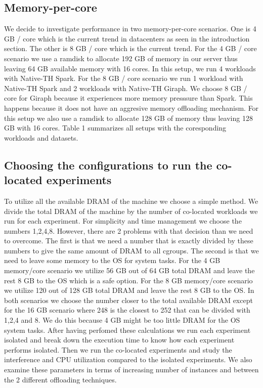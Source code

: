 \subsection{Memory-per-core}
We decide to investigate performance in two memory-per-core scenarios. One is 4 GB / core 
which is the current trend in datacenters as seen in the introduction section. The other
is 8 GB / core which is the current trend. For the 4 GB / core scenario we use a ramdisk to 
allocate 192 GB of memory in our server thus leaving 64 GB available memory with 16 cores. In this setup, we run 4
workloads with Native-TH Spark. For the 8 GB / core scenario we run 1 workload with Native-TH Spark and 2 workloads with Native-TH Giraph. We choose 8 GB / core for Giraph because it experiences more memory presssure than Spark. This happens because it does not have
an aggresive memory offloading mechanism. For this setup we also use a ramdisk to allocate 128 GB of memory thus leaving 
128 GB with 16 cores. 
Table 1 summarizes all setups with the coresponding workloads and datasets.

\subsection{Choosing the configurations to run the co-located experiments}
To utilize all the available DRAM of the machine we choose a simple method. 
We divide the total DRAM of the machine by the number of co-located workloads we run for each experiment.
For simplicity and time management we choose the numbers 1,2,4,8. However, there are 2 problems with that decision
than we need to overcome. The first is that we need a number that is exactly divided by these numbers to give the same amount of DRAM to
all cgroups. The second is that we need to leave some memory to the OS for system tasks. For the 4 GB memory/core scenario we utilize
56 GB out of 64 GB total DRAM and leave the rest 8 GB to the OS which is a safe option. For the 8 GB memory/core scenario we utilize
120 out of 128 GB total DRAM and leave the rest 8 GB to the OS. 
In both scenarios we choose the number closer to
the total available DRAM except for the 16 GB scenario where 248 is the closest to 252 that can be divided with 1,2,4 and 8. We do this because 4 GB might be too little DRAM for the OS system tasks. After having perfomed these calculations we run each experiment isolated and break down the execution time to know how each experiment performs isolated. Then we run the co-located experiments and study the interference and CPU utilization compared to the isolated experiments. We also examine these parameters in terms of increasing number of instances and between the 2 different offloading techniques. 

